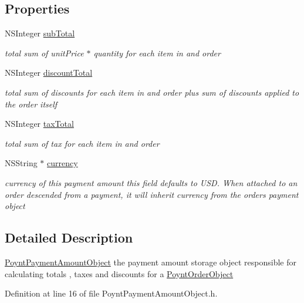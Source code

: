 \subsection*{Properties}
\begin{DoxyCompactItemize}
\item 
N\+S\+Integer \hyperlink{interface_poynt_payment_amount_object_a6d7b64fe4a742c91067809f34bb7d2a2}{sub\+Total}
\begin{DoxyCompactList}\small\item\em total sum of unit\+Price $\ast$ quantity for each item in and order \end{DoxyCompactList}\item 
N\+S\+Integer \hyperlink{interface_poynt_payment_amount_object_a8a8c1f8f98bf7dc619baeb011a92aa93}{discount\+Total}
\begin{DoxyCompactList}\small\item\em total sum of discounts for each item in and order plus sum of discounts applied to the order itself \end{DoxyCompactList}\item 
N\+S\+Integer \hyperlink{interface_poynt_payment_amount_object_a86fed8c7d04bd309d6af2d0e75942163}{tax\+Total}
\begin{DoxyCompactList}\small\item\em total sum of tax for each item in and order \end{DoxyCompactList}\item 
N\+S\+String $\ast$ \hyperlink{interface_poynt_payment_amount_object_a71a9104f71558df8791cedc5e81941a3}{currency}
\begin{DoxyCompactList}\small\item\em currency of this payment amount  this field defaults to U\+SD. When attached to an order descended from a payment, it will inherit currency from the order\textquotesingle{}s payment object \end{DoxyCompactList}\end{DoxyCompactItemize}


\subsection{Detailed Description}
\hyperlink{interface_poynt_payment_amount_object}{Poynt\+Payment\+Amount\+Object}  the payment amount storage object responsible for calculating totals , taxes and discounts for a \hyperlink{interface_poynt_order_object}{Poynt\+Order\+Object} 

Definition at line 16 of file Poynt\+Payment\+Amount\+Object.\+h.



